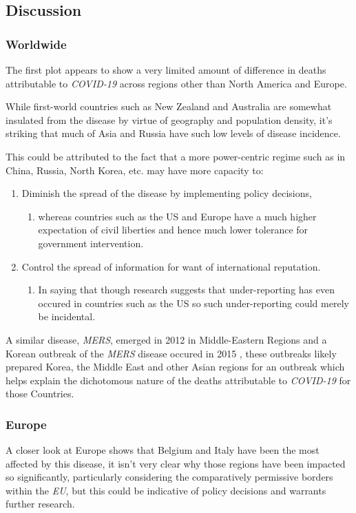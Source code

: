 \documentclass[11pt]{article}
\begin{document}
\subsection{Discussion}
\label{sec:org1da0c28}
\subsubsection{Worldwide}
\label{sec:org910bcef}
The first plot appears to show a very limited amount of difference in deaths
attributable to \emph{COVID-19} across regions other than North America and
Europe.

While first-world countries such as New Zealand and Australia are
somewhat insulated from the disease by virtue of geography and population
density, it's striking that much of Asia and Russia have such low levels of
disease incidence.

This could be attributed to the fact that a more power-centric regime such as in
China, Russia, North Korea, etc. may have more capacity to:

\begin{enumerate}
\item Diminish the spread of the disease by implementing
policy decisions,
\begin{enumerate}
\item whereas countries such as the US and Europe have a much higher expectation
of civil liberties and hence much lower tolerance for government intervention.
\end{enumerate}
\item Control the spread of information for want of international reputation.
\begin{enumerate}
\item In saying that though research suggests that under-reporting has even
occured in countries such as the US \cite{sood2020} so such under-reporting
could merely be incidental.
\end{enumerate}
\end{enumerate}

A similar disease, \emph{MERS}, emerged in 2012 in Middle-Eastern Regions
\cite{woodley2020} and a Korean outbreak of the \emph{MERS} disease occured in 2015
\cite{serrano2015}, these outbreaks likely prepared Korea, the Middle East and
other Asian regions for an outbreak which helps explain the dichotomous
nature of the deaths attributable to \emph{COVID-19} for those Countries.

\subsubsection{Europe}
\label{sec:org4a33815}
A closer look at Europe shows that Belgium and Italy have been the most affected
by this disease, it isn't very clear why those regions have been impacted so
significantly, particularly considering the comparatively permissive borders
within the \emph{EU}, but this could be indicative of policy decisions and warrants
further research.
\end{document}
